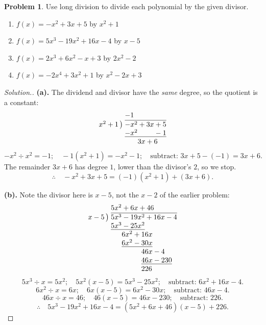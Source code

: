 \documentclass[11pt,a4paper]{article}
\theoremstyle{definition}
\newtheorem{problemx}{Problem}[section]
\newenvironment{problem}{\begin{problemx}}{\end{problemx}}
\newenvironment{solution}
  {\renewcommand{\qedsymbol}{}\begin{proof}[\textit{Solution}.]}
  {\end{proof}}
\begin{document}
\begin{problem}
Use long division to divide each polynomial by the given divisor.
\begin{enumerate}
\item[(a).] $f(x)=-x^2+3x+5$ by $x^2+1$
\item[(b).] $f(x)=5x^3-19x^2+16x-4$ by $x-5$
\item[(c).] $f(x)=2x^3+6x^2-x+3$ by $2x^2-2$
\item[(d).] $f(x)=-2x^4+3x^2+1$ by $x^2-2x+3$
\end{enumerate}
\end{problem}

\begin{solution}
\textbf{(a).} The dividend and divisor have the \emph{same} degree, so the quotient is a
constant:
$$\begin{array}{r@{\;}l}
 & -1\\
x^{2}+1\,\big) & \overline{-x^{2}+3x+5}\\
 & \underline{-x^{2}\phantom{{}+3x}-1}\\
 & \phantom{-x^{2}}3x+6
\end{array}$$
$$-x^2\div x^2=-1;\quad -1\left(x^2+1\right)=-x^2-1;\quad
\text{subtract: } 3x+5-(-1)=3x+6.$$
The remainder $3x+6$ has degree $1$, lower than the divisor's $2$, so we stop.
$$\therefore\quad -x^2+3x+5=(-1)\left(x^2+1\right)+(3x+6).$$

\textbf{(b).} Note the divisor here is $x-5$, not the $x-2$ of the earlier problem:
$$\begin{array}{r@{\;}l}
 & 5x^{2}+6x+46\\
x-5\,\big) & \overline{5x^{3}-19x^{2}+16x-4}\\
 & \underline{5x^{3}-25x^{2}}\phantom{{}+16x-4}\\
 & \phantom{5x^{3}}6x^{2}+16x\phantom{{}-4}\\
 & \phantom{5x^{3}}\underline{6x^{2}-30x}\phantom{{}-4}\\
 & \phantom{5x^{3}+6x^{2}}46x-4\\
 & \phantom{5x^{3}+6x^{2}}\underline{46x-230}\\
 & \phantom{5x^{3}+6x^{2}}226
\end{array}$$
$$5x^3\div x=5x^2;\quad 5x^2(x-5)=5x^3-25x^2;\quad \text{subtract: } 6x^2+16x-4.$$
$$6x^2\div x=6x;\quad 6x(x-5)=6x^2-30x;\quad \text{subtract: } 46x-4.$$
$$46x\div x=46;\quad 46(x-5)=46x-230;\quad \text{subtract: } 226.$$
$$\therefore\quad 5x^3-19x^2+16x-4=\left(5x^2+6x+46\right)(x-5)+226.$$


\end{solution}
\end{document}
